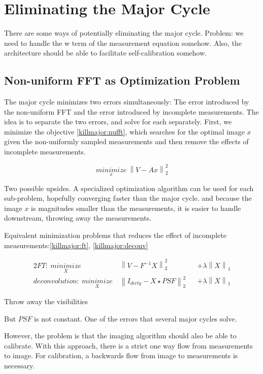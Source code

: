 \section{Eliminating the Major Cycle}\label{killmajor}

There are some ways of potentially eliminating the major cycle. Problem: we need to handle the w term of the measurement equation somehow. Also, the architecture should be able to facilitate self-calibration somehow.


\subsection{Non-uniform FFT as Optimization Problem}
The major cycle minimizes two errors simultaneously: The error introduced by the non-uniform FFT and the error introduced by incomplete measurements. The idea is to separate the two errors, and solve for each separately. First, we minimize the objective \eqref{killmajor:nufft}, which searches for the optimal image $x$ given the non-uniformly sampled measurements and then remove the effects of incomplete measurements.

\begin{equation}\label{killmajor:nufft}
\underset{x}{minimize} \: \left \| V - Ax \right \|_2^2
\end{equation}

Two possible upsides. A specialized optimization algorithm can be used for each sub-problem, hopefully converging faster than the major cycle. and because the image $x$ is magnitudes smaller than the measurements, it is easier to handle downstream, throwing away the measurements. 

Equivalent minimization problems that reduces the effect of incomplete measurements:\eqref{killmajor:ft}, \eqref{killmajor:deconv}

\begin{alignat}{2}
FT:\: \underset{X}{minimize} \:& \left \|  V - F^{-1}X \right \|_2^2 &&+  \lambda \left \| X \right \|_1 \label{killmajor:ft}\\
deconvolution:\: \underset{X}{minimize} \:& \left \| I_{dirty} - X \star PSF \right \|_2^2 &&+ \lambda \left \| X \right \|_1 \label{killmajor:deconv}
\end{alignat}

Throw away the visibilities

But $PSF$ is not constant. One of the errors that several major cycles solve.

However, the problem is that the imaging algorithm should also be able to calibrate. With this approach, there is a strict one way flow from measurements to image. For calibration, a backwards flow from image to measurements is necessary.

